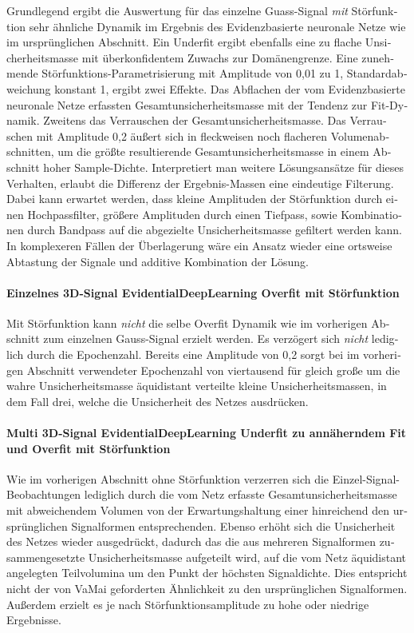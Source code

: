 \begin{otherlanguage}{ngerman}
Grundlegend ergibt die Auswertung für das einzelne Guass-Signal \textit{mit} Störfunktion sehr ähnliche Dynamik im Ergebnis des \gls{Evidenzbasierte neuronale Netze} wie im ursprünglichen Abschnitt. Ein Underfit ergibt ebenfalls eine zu flache Unsicherheitsmasse mit überkonfidentem Zuwachs zur Domänengrenze. Eine zunehmende Störfunktions-Parametrisierung mit Amplitude von 0,01 zu 1, Standardabweichung konstant 1, ergibt zwei Effekte. Das Abflachen der vom \gls{Evidenzbasierte neuronale Netze} erfassten Gesamtunsicherheitsmasse mit der Tendenz zur Fit-Dynamik. Zweitens das Verrauschen der Gesamtunsicherheitsmasse. Das Verrauschen mit Amplitude 0,2 äußert sich in fleckweisen noch flacheren Volumenabschnitten, um die größte resultierende Gesamtunsicherheitsmasse in einem Abschnitt hoher Sample-Dichte. Interpretiert man weitere Lösungsansätze für dieses Verhalten, erlaubt die Differenz der Ergebnis-Massen eine eindeutige Filterung. Dabei kann erwartet werden, dass kleine Amplituden der Störfunktion durch einen Hochpassfilter, größere Amplituden durch einen Tiefpass, sowie Kombinationen durch Bandpass auf die abgezielte Unsicherheitsmasse gefiltert werden kann. In komplexeren Fällen der Überlagerung wäre ein Ansatz wieder eine ortsweise Abtastung der Signale und additive Kombination der Lösung. 



\paragraph{Einzelnes 3D-Signal \gls{EvidentialDeepLearning} Overfit mit Störfunktion}

Mit Störfunktion kann \textit{nicht} die selbe Overfit Dynamik wie im vorherigen Abschnitt zum einzelnen Gauss-Signal erzielt werden. Es verzögert sich \textit{nicht} lediglich durch die Epochenzahl. Bereits eine Amplitude von 0,2 sorgt bei im vorherigen Abschnitt verwendeter Epochenzahl von viertausend für gleich große um die wahre Unsicherheitsmasse äquidistant verteilte kleine Unsicherheitsmassen, in dem Fall drei, welche die Unsicherheit des Netzes ausdrücken. 



\paragraph{Multi 3D-Signal \gls{EvidentialDeepLearning} Underfit zu annäherndem Fit und Overfit mit Störfunktion} 

Wie im vorherigen Abschnitt ohne Störfunktion verzerren sich die Einzel-Signal-Beobachtungen lediglich durch die vom Netz erfasste Gesamtunsicherheitsmasse mit abweichendem Volumen von der Erwartungshaltung einer hinreichend den ursprünglichen Signalformen entsprechenden.  Ebenso erhöht sich die Unsicherheit des Netzes wieder ausgedrückt, dadurch das die aus mehreren Signalformen zusammengesetzte Unsicherheitsmasse aufgeteilt wird, auf die vom Netz äquidistant angelegten Teilvolumina um den Punkt der höchsten Signaldichte. Dies entspricht nicht der von VaMai geforderten Ähnlichkeit zu den ursprünglichen Signalformen. Außerdem erzielt es je nach Störfunktionsamplitude zu hohe oder niedrige Ergebnisse. 



\end{otherlanguage}
